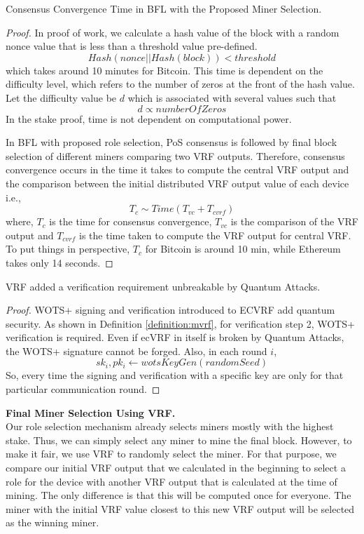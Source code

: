 \documentclass[lettersize,journal]{IEEEtran}
\begin{document}
\begin{prop}
Consensus Convergence Time in BFL with the Proposed Miner Selection.
\end{prop}
\begin{proof}
In proof of work, we calculate a hash value of the block with a random nonce value that is less than a
threshold value pre-defined.
$$Hash(nonce || Hash(block)) < threshold$$ which takes around 10 minutes for Bitcoin.
This time is dependent on the difficulty level, which refers to the number of zeros at the front of the hash value.
Let the difficulty value be $d$ which is associated with several values such that $$ d \propto numberOfZeros$$
In the stake proof, time is not dependent on computational power.

In BFL with proposed role selection, PoS consensus is followed by final block selection of different
miners comparing two VRF outputs.
Therefore, consensus convergence occurs in the time it takes to compute the central VRF output and the comparison
between the initial distributed VRF output value of each device i.e.,
$$T_{c} \sim Time(T_{vc} + T_{cvrf})$$
where, $T_c$ is the time for consensus convergence, $T_{vc}$ is the comparison of the VRF output and $T_{cvrf}$ is the time taken to compute the VRF output for
central VRF.
To put things in perspective, $T_{c}$ for Bitcoin is around 10 min, while Ethereum takes only 14 seconds. 
\end{proof}


\begin{prop}
VRF added a verification requirement unbreakable by Quantum Attacks.
\end{prop}
\begin{proof}
WOTS+ signing and verification introduced to ECVRF add quantum security.
As shown in Definition \ref{definition:mvrf}, for verification step 2, WOTS+ verification is required.
Even if ecVRF in itself is broken by Quantum Attacks, the WOTS+ signature cannot be forged.
Also, in each round $i$, 
$$sk_i, pk_i \leftarrow wotsKeyGen(randomSeed) $$
So, every time the signing and verification with a specific key are only for that particular communication round.
\end{proof}

\noindent \textbf{Final Miner Selection Using VRF.}\\
Our role selection mechanism already selects miners
mostly with the highest stake. 
Thus, we can simply select any miner to mine the
final block.
However, to make it fair, we use VRF to randomly select
the miner.
For that purpose, we compare our initial VRF output that
we calculated in the beginning to select a role
for the device with another VRF output that is calculated
at the time of mining.
The only difference is that this will be computed once
for everyone.
The miner with the initial VRF value closest to this
new VRF output will be selected as the winning miner.
\end{document}
